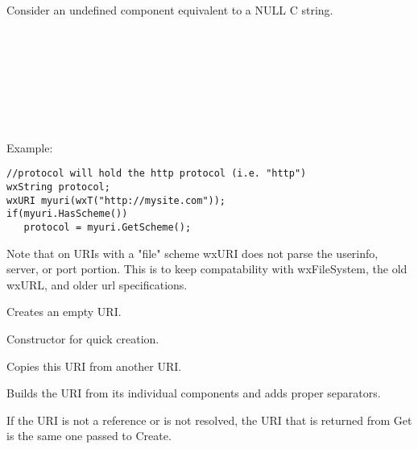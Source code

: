 Consider an undefined component equivalent to a 
NULL C string.\\
\\ 
\\
\\
\\
\\
\\
\\

Example:
\begin{verbatim}
//protocol will hold the http protocol (i.e. "http")
wxString protocol;
wxURI myuri(wxT("http://mysite.com"));
if(myuri.HasScheme())
   protocol = myuri.GetScheme();
\end{verbatim}

\label{deviationsfromrfc}

Note that on URIs with a "file" scheme wxURI does not
parse the userinfo, server, or port portion.  This is to keep 
compatability with wxFileSystem, the old wxURL, and older url specifications.

\label{wxuriwxuri}


Creates an empty URI.


Constructor for quick creation.



Copies this URI from another URI.



\label{wxuribuilduri}


Builds the URI from its individual components and adds proper separators.

If the URI is not a reference or is not resolved, 
the URI that is returned from Get is the same one 
passed to Create.


\label{wxuribuildunescapeduri}

